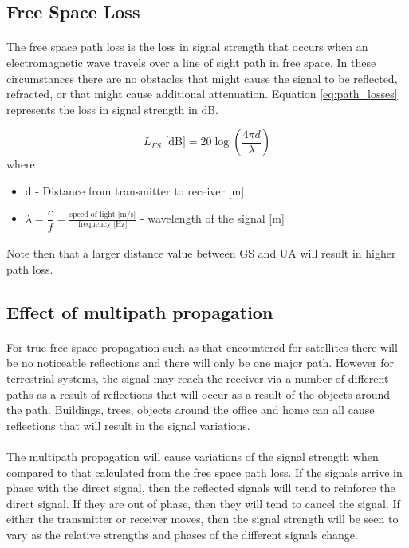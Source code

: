 \subsection*{Free Space Loss}\label{subsec:path_loss}
\paragraph{}
The free space path loss is the loss in signal strength that occurs when an electromagnetic wave travels over a line of sight path in free space. In these circumstances there are no obstacles that might cause the signal to be reflected, refracted, or that might cause additional attenuation. Equation \ref{eq:path_losses} represents the loss in signal strength in dB.

\begin{equation}\label{eq:path_losses}
	L_{FS}\text{ [dB]} = 20\log\left (\frac{4\pi d}{\lambda} \right)
\end{equation}
where
\begin{itemize}
	\item d - Distance from transmitter to receiver [m]
	\item $\lambda  = \dfrac{c}{f} = \frac{\text{speed of light [m/s]}}{\text{frequency [Hz]}}$ - wavelength of the signal [m]
\end{itemize}

\paragraph{} Note then that a larger distance value between GS and UA will result in higher path loss.

\subsection*{Effect of multipath propagation}
\paragraph{}For true free space propagation such as that encountered for satellites there will be no noticeable reflections and there will only be one major path. However for terrestrial systems, the signal may reach the receiver via a number of different paths as a result of reflections that will occur as a result of the objects around the path. Buildings, trees, objects around the office and home can all cause reflections that will result in the signal variations.

\paragraph{}The multipath propagation will cause variations of the signal strength when compared to that calculated from the free space path loss. If the signals arrive in phase with the direct signal, then the reflected signals will tend to reinforce the direct signal. If they are out of phase, then they will tend to cancel the signal. If either the transmitter or receiver moves, then the signal strength will be seen to vary as the relative strengths and phases of the different signals change.